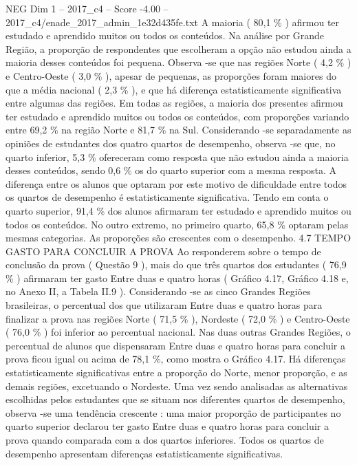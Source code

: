 \begin{textsample}{NEG Dim 1 – 2017\_c4 – Score -4.00 – 2017\_c4/enade\_2017\_admin\_1e32d435fe.txt}
A maioria ( 80,1 \% ) afirmou ter estudado e aprendido muitos ou todos os conteúdos.
Na análise por Grande Região, a proporção de respondentes que escolheram a opção não estudou ainda a maioria desses conteúdos foi pequena.
Observa -se que nas regiões Norte ( 4,2 \% ) e Centro-Oeste ( 3,0 \% ), apesar de pequenas, as proporções foram maiores do que a média nacional ( 2,3 \% ), e que há diferença estatisticamente significativa entre algumas das regiões.
Em todas as regiões, a maioria dos presentes afirmou ter estudado e aprendido muitos ou todos os conteúdos, com proporções variando entre 69,2 \% na região Norte e 81,7 \% na Sul.
Considerando -se separadamente as opiniões de estudantes dos quatro quartos de desempenho, observa -se que, no quarto inferior, 5,3 \% ofereceram como resposta que não estudou ainda a maioria desses conteúdos, sendo 0,6 \% os do quarto superior com a mesma resposta.
A diferença entre os alunos que optaram por este motivo de dificuldade entre todos os quartos de desempenho é estatisticamente significativa.
Tendo em conta o quarto superior, 91,4 \% dos alunos afirmaram ter estudado e aprendido muitos ou todos os conteúdos.
No outro extremo, no primeiro quarto, 65,8 \% optaram pelas mesmas categorias.
As proporções são crescentes com o desempenho. 4.7 TEMPO GASTO PARA CONCLUIR A PROVA Ao responderem sobre o tempo de conclusão da prova ( Questão 9 ), mais do que três quartos dos estudantes ( 76,9 \% ) afirmaram ter gasto Entre duas e quatro horas ( Gráfico 4.17, Gráfico 4.18 e, no Anexo II, a Tabela II.9 ).
Considerando -se as cinco Grandes Regiões brasileiras, o percentual dos que utilizaram Entre duas e quatro horas para finalizar a prova nas regiões Norte ( 71,5 \% ), Nordeste ( 72,0 \% ) e Centro-Oeste ( 76,0 \% ) foi inferior ao percentual nacional.
Nas duas outras Grandes Regiões, o percentual de alunos que dispensaram Entre duas e quatro horas para concluir a prova ficou igual ou acima de 78,1 \%, como mostra o Gráfico 4.17.
Há diferenças estatisticamente significativas entre a proporção do Norte, menor proporção, e as demais regiões, excetuando o Nordeste.
Uma vez sendo analisadas as alternativas escolhidas pelos estudantes que se situam nos diferentes quartos de desempenho, observa -se uma tendência crescente : uma maior proporção de participantes no quarto superior declarou ter gasto Entre duas e quatro horas para concluir a prova quando comparada com a dos quartos inferiores.
Todos os quartos de desempenho apresentam diferenças estatisticamente significativas.

\end{textsample}
